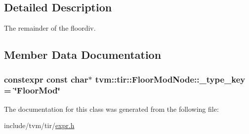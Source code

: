 \subsection{Detailed Description}
The remainder of the floordiv. 

\subsection{Member Data Documentation}
\subsubsection[{\texorpdfstring{\+\_\+type\+\_\+key}{_type_key}}]{\setlength{\rightskip}{0pt plus 5cm}constexpr const char$\ast$ tvm\+::tir\+::\+Floor\+Mod\+Node\+::\+\_\+type\+\_\+key = \char`\"{}Floor\+Mod\char`\"{}\hspace{0.3cm}{\ttfamily [static]}}\hypertarget{classtvm_1_1tir_1_1FloorModNode_a4357e6358dadc500972c4b8520bcc8df}{}\label{classtvm_1_1tir_1_1FloorModNode_a4357e6358dadc500972c4b8520bcc8df}


The documentation for this class was generated from the following file\+:\begin{DoxyCompactItemize}
\item 
include/tvm/tir/\hyperlink{tir_2expr_8h}{expr.\+h}\end{DoxyCompactItemize}
